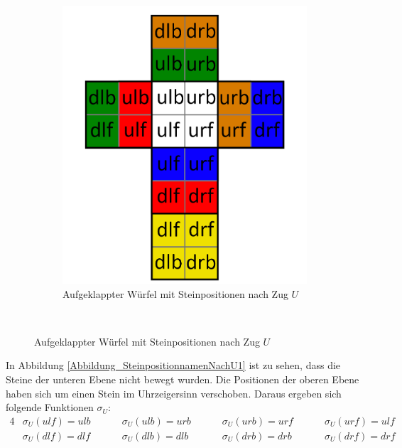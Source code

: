 \documentclass[12pt,a4paper, usenames, dvipsnames]{article}
\theoremstyle{mystyle}
\theoremstyle{definition}
\begin{document}
\begin{figure}[h]
\begin{minipage}[b][][b]{0.43\textwidth}
\begin{figure}[H]
\centering
\includegraphics[scale=0.15]{foldedout_spin.png}
\caption[Aufgeklappter Würfel mit Namen der Steinpositionen nach Zug $U$]{Aufgeklappter Würfel mit Steinpositionen nach Zug $U$}
\label{Abbildung_SteinpositionnamenNachU2}
\end{figure}

\end{minipage}\begin{minipage}[b][][b]{0.04\textwidth}$\ $ \end{minipage}
\end{figure}

In Abbildung \ref{Abbildung_SteinpositionnamenNachU1} ist zu sehen, dass die Steine der unteren Ebene nicht bewegt wurden. Die Positionen der oberen Ebene haben sich um einen Stein im Uhrzeigersinn verschoben. Daraus ergeben sich folgende Funktionen $\sigma_U$:
\begin{alignat*}{4}
& \sigma_U(\textit{ulf})=\textit{ulb} \ \ \ \ \ \ \ && \sigma_U(\textit{ulb})=\textit{urb} \ \ \ \ \ \ \ && \sigma_U(\textit{urb})=\textit{urf} \ \ \ \ \ \ \ && \sigma_U(\textit{urf})=\textit{ulf} \\
& \sigma_U(\textit{dlf})=\textit{dlf} \ \ \ \ \ \ \ && \sigma_U(\textit{dlb})=\textit{dlb} \ \ \ \ \ \ \ && \sigma_U(\textit{drb})=\textit{drb} \ \ \ \ \ \ \ && \sigma_U(\textit{drf})=\textit{drf} 
\end{alignat*}
\end{document}
